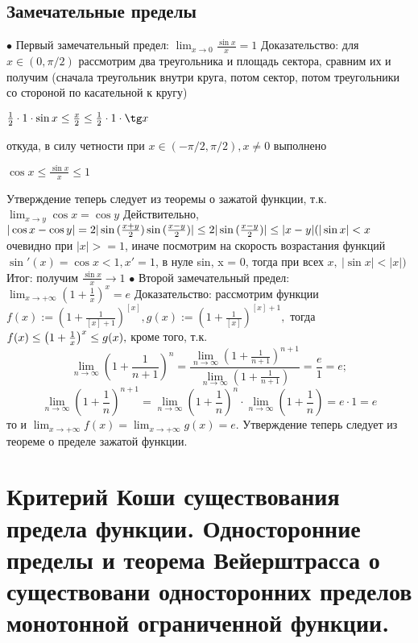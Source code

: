 \documentclass[12pt]{article}
\theoremstyle{definition}
\begin{document}
\subsection{Замечательные пределы}
$\bullet$ Первый замечательный предел: $\lim_{x \to 0}\frac{\sin x}{x} = 1$ \newline
Доказательство: для $x \in (0, \pi/2)$ рассмотрим два треугольника и площадь сектора, сравним их и получим (сначала треугольник внутри круга, потом сектор, потом треугольники со стороной по касательной к кругу)
\begin{center}
$\frac12 \cdot 1 \cdot \sin x \leq \frac{x}2\leq \frac12 \cdot 1 \cdot \tg x$
\end{center}
откуда, в силу четности при $x \in (-\pi/2, \pi/2), x \not = 0$ выполнено
\begin{center}
$\cos x \leq \frac{\sin x}{x} \leq 1$
\end{center}
Утверждение теперь следует из теоремы о зажатой функции, т.к. $\lim_{x \to y} \cos x = \cos y$\newline
Действительно, $|\cos x - \cos y| = 2|\sin{(\frac{x+y}{2})}\sin{(\frac{x-y}{2})}| \leq 2|\sin{(\frac{x-y}{2})}|\leq |x - y| \\ (|\sin{x}| < x$ очевидно при $|x| >=1 $, иначе посмотрим на скорость возрастания функций $\sin'(x) =\cos{x} < 1, x' = 1$, в нуле sin, x = 0, тогда при всех $x,\ |\sin{x}| < |x|)$\\ Итог: получим $\frac{\sin{x}}{x} \rightarrow 1$
\newline\newline
$\bullet$ Второй замечательный предел: $\lim _{x \to +\infty}\left(1 + \frac1x\right)^x = e$\newline
Доказательство: рассмотрим функции $f(x) := (1 + \frac{1}{[x] + 1})^{[x]}, g(x) := (1 + \frac{1}{[x]})^{[x] + 1}, $ тогда $ \newline
f(x) \leq \left(1 + \frac1x\right)^x \leq g(x), $ кроме того, т.к. $$\lim _{{n\to \infty }}\left(1+{\frac  {1}{n+1}}\right)^{n}={\frac  {\lim \limits _{{n\to \infty }}(1+{\frac  {1}{n+1}})^{{n+1}}}{\lim \limits _{{n\to \infty }}\left(1+{\frac  {1}{n+1}}\right)}}={\frac  {e}{1}}=e;$$
$$\lim _{{n\to \infty }}\left(1+{\frac  {1}{n}}\right)^{{n+1}}=\lim _{{n\to \infty }}\left(1+{\frac  {1}{n}}\right)^{n}\cdot \lim _{{n\to \infty }}\left(1+{\frac  {1}{n}}\right)=e\cdot 1=e$$ то и $\lim_{x \to +\infty} f(x) = \lim_{x \to +\infty} g(x) =e$. Утверждение теперь следует из теореме о пределе зажатой функции.

\section{Критерий Коши существования предела функции. Односторонние пределы и теорема Вейерштрасса о существовани односторонних пределов монотонной ограниченной функции.
}
\end{document}
